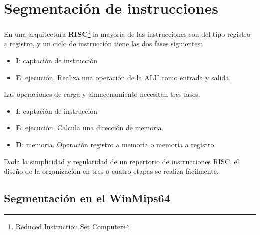 \section{Segmentación de instrucciones}

En una arquitectura \textbf{RISC}\footnote{Reduced Instruction Set Computer} la mayoría de las instrucciones son del tipo registro a registro, y un ciclo de instrucción tiene las dos fases siguientes:

\begin{itemize}
  \item \textbf{I}: captación de instrucción
  \item \textbf{E}: ejecución. Realiza una operación de la ALU como entrada y salida.
\end{itemize}

Las operaciones de carga y almacenamiento necesitan tres fases:

\begin{itemize}
  \item \textbf{I}: captación de instrucción
  \item \textbf{E}: ejecución. Calcula una dirección de memoria.
  \item \textbf{D}: memoria. Operación registro a memoria o memoria a registro.
\end{itemize}

Dada la simplicidad y regularidad de un repertorio de instrucciones RISC, el diseño de la organización en tres o cuatro etapas se realiza fácilmente. 

\subsection{Segmentación en el WinMips64}

